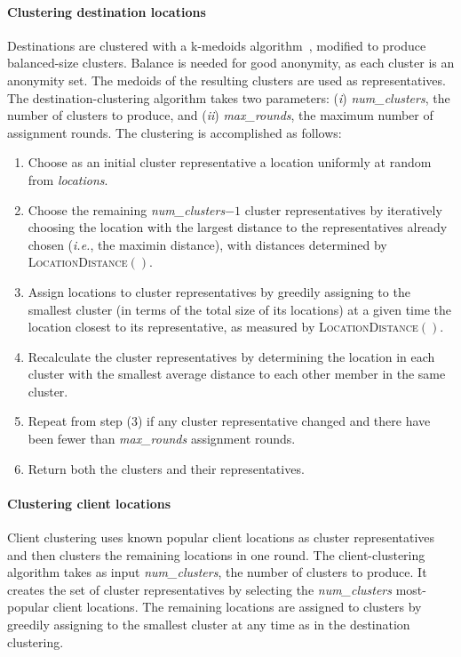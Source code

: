 \documentclass[conference]{styles/IEEEtran}
\newcommand{\ie}{\emph{i.e.}}
\newcommand{\compactify}{\settowidth{\labelsep}{o} \settowidth{\labelwidth}{o} \settowidth{\labelindent}{o}}
\begin{document}
\paragraph{Clustering destination locations}
Destinations are clustered with a k-medoids algorithm~\cite{park-medoid-voronoi-2009}, modified to
produce balanced-size clusters. Balance is needed for good anonymity, as each cluster is an
anonymity set. The medoids of the resulting clusters are used as representatives. 
The destination-clustering algorithm takes two parameters: (\emph{i}) \textit{num\_clusters},
the number of clusters to produce, and (\emph{ii}) \textit{max\_rounds}, the maximum number of
assignment rounds. The clustering is accomplished as follows:
\begin{enumerate}[\compactify]
	\item Choose as an initial cluster representative a location uniformly at random from
	\textit{locations}.

    \item Choose the remaining \textit{num\_clusters}$-1$ cluster representatives by
    iteratively choosing the location with the largest distance to the representatives
    already chosen (\ie{}, the maximin distance), with distances determined by
    \textsc{LocationDistance}$()$.


    \item Assign locations to cluster representatives by greedily assigning to the smallest
    cluster (in terms of the total size of its locations) at a given time the location closest to
    its representative, as measured by \textsc{LocationDistance}$()$.


    \item Recalculate the cluster representatives by determining the location in
    each cluster with the smallest average distance to each other member in the
    same cluster.

    \item Repeat from step (3) if any cluster representative changed and there have been fewer than
    \textit{max\_rounds} assignment rounds.

    \item Return both the clusters and their representatives.
\end{enumerate}



\paragraph{Clustering client locations}
Client clustering uses known popular client locations as cluster representatives and
then clusters the remaining locations in one round. The client-clustering algorithm takes as input
\textit{num\_clusters}, the number of clusters to produce. It creates
the set of cluster representatives by selecting the \textit{num\_clusters} most-popular client
locations. The remaining locations are assigned to clusters by greedily assigning to the smallest
cluster at any time as in the destination clustering.
\end{document}
